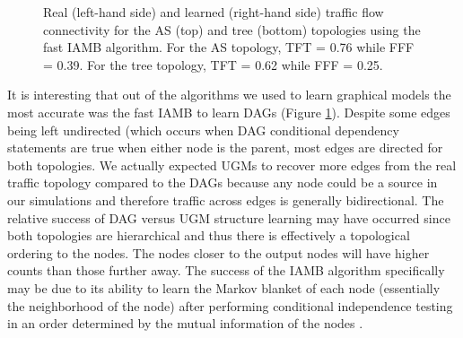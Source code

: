 \documentclass[conference]{IEEEtran}
\begin{document}
\begin{figure}%
    \centering
    \qquad
    \caption{Real (left-hand side) and learned (right-hand side) traffic flow connectivity for the AS (top) and tree (bottom) topologies using the fast IAMB algorithm. For the AS topology, TFT = 0.76 while FFF = 0.39. For the tree topology, TFT = 0.62 while FFF = 0.25.}
    \label{fig:graphs}

\end{figure}

It is interesting that out of the algorithms we used to learn graphical models the most accurate was the fast IAMB to learn DAGs (Figure \ref{fig:graphs}). Despite some edges being left undirected (which occurs when DAG conditional dependency statements are true when either node is the parent, most edges are directed for both topologies. We actually expected UGMs to recover more edges from the real traffic topology compared to the DAGs because any node could be a source in our simulations and therefore traffic across edges is generally bidirectional. The relative success of DAG versus UGM structure learning may have occurred since both topologies are hierarchical and thus there is effectively a topological ordering to the nodes. The nodes closer to the output nodes will have higher counts than those further away. The success of the IAMB algorithm specifically may be due to its ability to learn the Markov blanket of each node (essentially the neighborhood of the node) after performing conditional independence testing in an order determined by the mutual information of the nodes \cite{b12}.  
\end{document}
